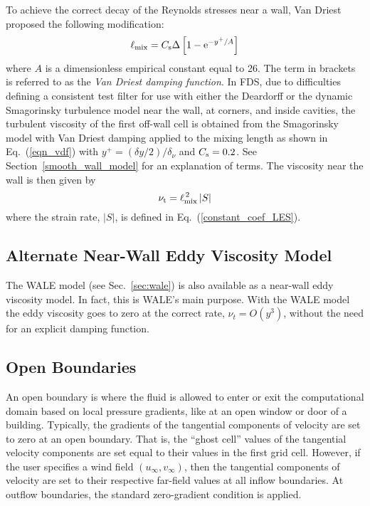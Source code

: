 To achieve the correct decay of the Reynolds stresses near a wall, Van Driest~\cite{Wilcox:1} proposed the following modification:
\begin{equation}
\label{eqn_vdf}
\ell_{\rm mix} = C_{\rm s} \Delta \left[ 1 - \mathrm{e}^{-y^+/A} \right]
\end{equation}
where $A$ is a dimensionless empirical constant equal to 26.  The term in brackets is referred to as the {\em Van Driest damping function}. In FDS, due to difficulties defining a consistent test filter for use with either the Deardorff or the dynamic Smagorinsky turbulence model near the wall, at corners, and inside cavities, the turbulent viscosity of the first off-wall cell is obtained from the Smagorinsky model with Van Driest damping applied to the mixing length as shown in Eq.~(\ref{eqn_vdf}) with $y^+ = (\delta y/2)/\delta_\nu$ and $C_{\rm s} = 0.2$.  See Section~\ref{smooth_wall_model} for an explanation of terms. The viscosity near the wall is then given by
\begin{equation}
   \nu_{\rm t} = \ell_{\rm mix}^{\,2}\,|S|  \label{eqn_nearwall_viscosity}
\end{equation}
where the strain rate, $|S|$, is defined in Eq.~(\ref{constant_coef_LES}).

\subsection{Alternate Near-Wall Eddy Viscosity Model}
\label{sec:wall_wale_model}

The WALE model (see Sec.~\ref{sec:wale}) is also available as a near-wall eddy viscosity model.  In fact, this is WALE's main purpose.  With the WALE model the eddy viscosity goes to zero at the correct rate, $\nu_t = O(y^3)$, without the need for an explicit damping function.

\subsection{Open Boundaries}

An open boundary is where the fluid is allowed to enter or exit the computational domain based on local pressure gradients, like at an open window or door of a building. Typically, the gradients of the tangential components of velocity are set to zero at an open boundary. That is, the ``ghost cell'' values of the tangential velocity components are set equal to their values in the first grid cell. However, if the user specifies a wind field $(u_\infty,v_\infty)$, then the tangential components of velocity are set to their respective far-field values at all inflow boundaries. At outflow boundaries, the standard zero-gradient condition is applied. 

